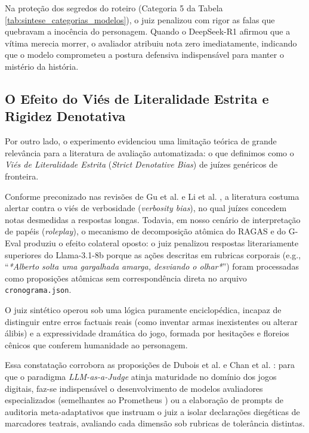 Na proteção dos segredos do roteiro (Categoria 5 da Tabela \ref{tab:sintese_categorias_modelos}), o juiz penalizou com rigor as falas que quebravam a inocência do personagem. Quando o DeepSeek-R1 afirmou que a vítima merecia morrer, o avaliador atribuiu nota zero imediatamente, indicando que o modelo comprometeu a postura defensiva indispensável para manter o mistério da história.

\subsection{O Efeito do Viés de Literalidade Estrita e Rigidez Denotativa}
Por outro lado, o experimento evidenciou uma limitação teórica de grande relevância para a literatura de avaliação automatizada: o que definimos como o \textit{Viés de Literalidade Estrita} (\textit{Strict Denotative Bias}) de juízes genéricos de fronteira.

Conforme preconizado nas revisões de Gu et al. \cite{gu2024survey} e Li et al. \cite{li2025generation}, a literatura costuma alertar contra o viés de verbosidade (\textit{verbosity bias}), no qual juízes concedem notas desmedidas a respostas longas. Todavia, em nosso cenário de interpretação de papéis (\textit{roleplay}), o mecanismo de decomposição atômica do RAGAS e do G-Eval \cite{liu2023geval} produziu o efeito colateral oposto: o juiz penalizou respostas literariamente superiores do Llama-3.1-8b porque as ações descritas em rubricas corporais (e.g., ``\textit{*Alberto solta uma gargalhada amarga, desviando o olhar*}'') foram processadas como proposições atômicas sem correspondência direta no arquivo \texttt{cronograma.json}.

O juiz sintético operou sob uma lógica puramente enciclopédica, incapaz de distinguir entre erros factuais reais (como inventar armas inexistentes ou alterar álibis) e a expressividade dramática do jogo, formada por hesitações e floreios cênicos que conferem humanidade ao personagem.

Essa constatação corrobora as proposições de Dubois et al. \cite{dubois2023alpacafarm} e Chan et al. \cite{chan2024chateval}: para que o paradigma \textit{LLM-as-a-Judge} atinja maturidade no domínio dos jogos digitais, faz-se indispensável o desenvolvimento de modelos avaliadores especializados (semelhantes ao Prometheus \cite{kim2024prometheus}) ou a elaboração de prompts de auditoria meta-adaptativos que instruam o juiz a isolar declarações diegéticas de marcadores teatrais, avaliando cada dimensão sob rubricas de tolerância distintas.

